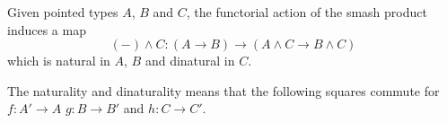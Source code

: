 \documentclass{article}
\newcommand{\pmap}{\to}
\newcommand{\smsh}{\wedge}
\begin{document}
\begin{thm}\label{thm:smash-functor-right}
Given pointed types $A$, $B$ and $C$, the functorial action of the smash product induces a map
$$({-})\smsh C:(A\pmap B)\pmap(A\smsh C\pmap B\smsh C)$$
which is natural in $A$, $B$ and dinatural in $C$.
\end{thm}
The naturality and dinaturality means that the following squares commute for $f : A' \to A$ $g:B\to B'$ and $h:C\to C'$.
\begin{center}
\end{center}
\end{document}
